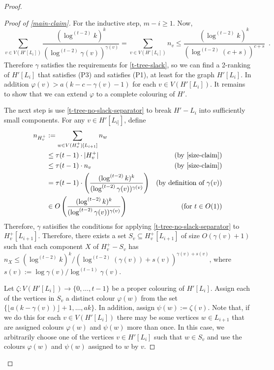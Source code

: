 \documentclass[kpfonts]{patmorin}
\theoremstyle{named}
\begin{document}
\begin{proof}
\begin{proof}[Proof of \cref{main-claim}]
        For the inductive step, $m-i\ge 1$.
        Now,
        \[
            \sum_{v\in V(H'[L_i])}\frac{(\log^{(t-2)} k)^k}{(\log^{(t-2)} \gamma(v))^{\gamma(v)}}
            = \sum_{v\in V(H'[L_i])} n_v
            \le \frac{(\log^{(t-2)} k)^k}{(\log^{(t-2)} (c+s))^{c+s}} \enspace .
        \]
       Therefore $\gamma$ satisfies the requirements for \cref{t-tree-slack}, so we can find a 2-ranking of $H'[L_i]$ that satisfies (P3) and satisfies (P1), at least for the graph $H'[L_i]$. In addition $\varphi(v)> a(k-c-\gamma(v)-1)$ for each $v\in V(H'[L_i])$.  It remains to show that we can extend $\varphi$ to a complete colouring of $H'$.

       The next step is use \cref{t-tree-no-slack-separator} to break $H'-L_i$ into sufficiently small components.  For any $v\in H'[L_{i]}]$, define
       \begin{align*}
          n_{H^+_v} & := \sum_{w\in V(H^+_v)[L_{i+1}]} n_w \\
                    & \le \tau(t-1)\cdot|H^+_v| & \text{(by \cref{size-claim})} \\
                    & \le \tau(t-1)\cdot n_v & \text{(by \cref{size-claim})} \\
                    & = \tau(t-1)\cdot\left(\frac{(\log^{(t-2)}k)^k}{(\log^{(t-2)}\gamma(v))^{\gamma(v)}}\right)
                    & \text{(by definition of $\gamma(v)$)} \\
                    & \in O\left(\frac{(\log^{(t-2)}k)^k}{(\log^{(t-2)}\gamma(v))^{\gamma(v)}}\right) &\text{(for $t\in O(1)$)}
       \end{align*}
       Therefore, $\gamma$ satisifies the conditions for applying \cref{t-tree-no-slack-separator} to $H^+_v[L_{i+1}]$.  Therefore, there exists a set $S_v\subseteq H^+_v[L_{i+1}]$ of size $O(\gamma(v)+1)$ such that each component $X$ of $H^+_v-S_v$ has $n_X\le (\log^{(t-2)} k)^k/(\log^{(t-2)} (\gamma(v))+s(v))^{\gamma(v)+s(v)}$, where $s(v):=\log\gamma(v)/\log^{(t-1)}\gamma(v)$.

       Let $\zeta:V(H'[L_i])\to\{0,\ldots,t-1\}$ be a proper colouring of $H'[L_i]$.  Assign each of the vertices in $S_v$ a distinct colour $\varphi(w)$ from the set $\{\lfloor a(k-\gamma(v))\rfloor+1,\ldots,ak\}$.  In addition, assign $\psi(w):=\zeta(v)$.  Note that, if we do this for each $v\in V(H'[L_i])$ there may be some vertices $w\in L_{i+1}$ that are assigned colours $\varphi(w)$ and $\psi(w)$ more than once.  In this case, we arbitrarily choose one of the vertices $v\in H'[L_i]$ such that $w\in S_v$ and use the colours $\varphi(w)$ and $\psi(w)$ assigned to $w$ by $v$.


\end{proof}
\end{proof}
\end{document}
